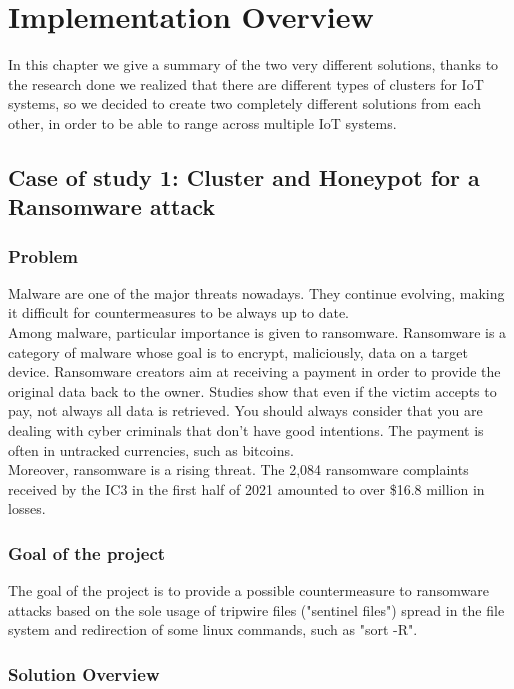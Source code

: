 \chapter{Implementation Overview}

In this chapter we give a summary of the two very different solutions, thanks to the research done we realized that there are different types of clusters for IoT systems, so we decided to create two completely different solutions from each other, in order to be able to range across multiple IoT systems.

\section{Case of study 1: Cluster and Honeypot for a Ransomware attack}

\subsection{Problem}

Malware are one of the major threats nowadays. They continue evolving, making it difficult for countermeasures to be always up to date. \\
Among malware, particular importance is given to ransomware. Ransomware is a category of malware whose goal is to encrypt, maliciously, data on a target device. Ransomware creators aim at receiving a payment in order to provide the original data back to the owner. Studies show that even if the victim accepts to pay, not always all data is retrieved. You should always consider that you are dealing with cyber criminals that don't have good intentions. The payment is often in untracked currencies, such as bitcoins.\\
Moreover, ransomware is a rising threat. The 2,084 ransomware complaints received by the IC3 in the first half of 2021 amounted to over \$16.8 million in losses.

\subsection{Goal of the project}

The goal of the project is to provide a possible countermeasure to ransomware attacks based on the sole usage of tripwire files ("sentinel files") spread in the file system and redirection of some linux commands, such as "sort -R".

\subsection{Solution Overview}

